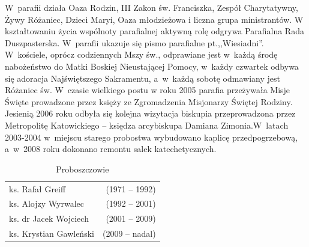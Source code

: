 \documentclass[a4paper,12pt]{article}
\begin{document}
W~parafii działa Oaza Rodzin, III Zakon św. Franciszka, Zespół Charytatywny, Żywy Różaniec, Dzieci Maryi, Oaza młodzieżowa i liczna grupa ministrantów. W kształtowaniu życia wspólnoty parafialnej aktywną rolę odgrywa Parafialna Rada Duszpasterska. W~parafii ukazuje się pismo parafialne pt.,,Wiesiadni''. W~kościele, oprócz codziennych Mszy św., odprawiane jest w~każdą środę nabożeństwo do Matki Boskiej Nieustającej Pomocy, w~każdy czwartek odbywa się adoracja Najświętszego Sakramentu, a~w~każdą sobotę odmawiany jest Różaniec św. W~czasie wielkiego postu w roku 2005 parafia przeżywała Misje Święte prowadzone przez księży ze Zgromadzenia Misjonarzy Świętej Rodziny. Jesienią 2006 roku odbyła się kolejna wizytacja biskupia przeprowadzona przez Metropolitę Katowickiego – księdza arcybiskupa Damiana Zimonia.W~latach 2003-2004 w~miejscu starego probostwa wybudowano kaplicę przedpogrzebową, a~w~2008 roku dokonano remontu salek katechetycznych.


\begin{table}[h]
\centering \caption{Proboszczowie}
\begin{tabular}{lr}
\hline
ks. Rafał Greiff &(1971 – 1992)\\
ks. Alojzy Wyrwalec &(1992 – 2001)\\
ks. dr Jacek Wojciech& (2001 – 2009)\\
ks. Krystian Gawleński& (2009 – nadal)\\
\end{tabular}
\end{table}
\end{document}
